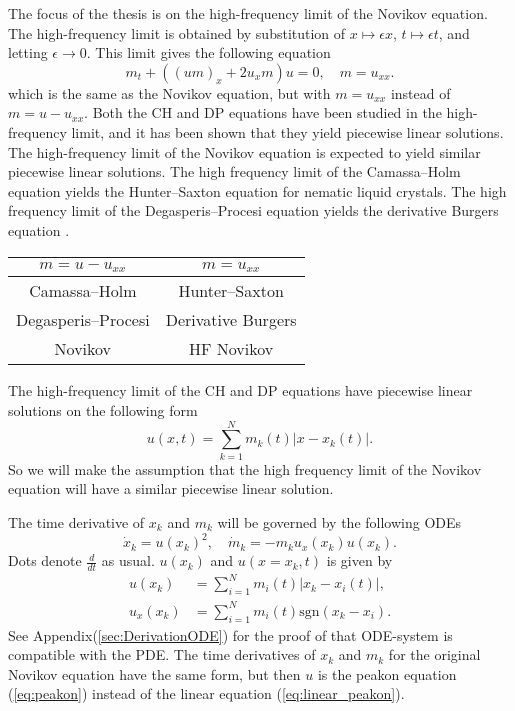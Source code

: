 \documentclass[english,master]{liumaiex}
\theoremstyle{plain}
\theoremstyle{definition}
\newcommand{\sgn}{\text{sgn}}
\begin{document}
The focus of the thesis is on the high-frequency limit of the Novikov equation. The high-frequency limit is obtained by substitution of $x \mapsto \epsilon x$, $t \mapsto \epsilon t$, and letting $\epsilon \rightarrow 0$. This limit gives the following equation
\begin{equation} \label{eq:Novikov_high_freq}
	m_t + ((um)_x + 2u_xm) u = 0,\quad m = u_{xx}.
\end{equation}
which is the same as the Novikov equation, but with $m = u_{xx}$ instead of $m = u - u_{xx}$. Both the CH and DP equations have been studied in the high-frequency limit, and it has been shown that they yield piecewise linear solutions. The high-frequency limit of the Novikov equation is expected to yield similar piecewise linear solutions. The high frequency limit of the Camassa--Holm equation yields the Hunter--Saxton equation \cite{HunterSaxton_1991,HunterZheng1994} for nematic liquid crystals. The high frequency limit of the Degasperis--Procesi equation yields the derivative Burgers equation \cite{Kohlenberg_2007, Lundmark_2008}.
\begin{center}
  \begin{tabular}{c|c}
    $m=u-u_{xx}$ & $m=u_{xx}$ \\
    \hline
    Camassa--Holm & Hunter--Saxton \\
    \hline
    Degasperis--Procesi & Derivative Burgers \\
    \hline
    Novikov & HF Novikov \\
  \end{tabular}
\end{center}

The high-frequency limit of the CH and DP equations have piecewise linear solutions on the following form
\begin{equation} \label{eq:linear_peakon}
	u(x, t) = \sum_{k = 1}^{N} m_k(t) |x - x_k(t)|.
\end{equation}
So we will make the assumption that the high frequency limit of the Novikov equation will have a similar piecewise linear solution.

The time derivative of $x_k$ and $m_k$ will be governed by the following ODEs
\begin{equation} \label{eq:peakon_odes}
\dot{x}_k = u(x_k)^2, \quad
\dot{m}_k = -m_ku_x(x_k)u(x_k).
\end{equation}
Dots denote $\frac{d}{dt}$ as usual. $u(x_k)$ and $u(x = x_k,t)$ is given by
\begin{align}
	u(x_k) &= \sum_{i = 1}^{N} m_i(t) |x_k - x_i(t)|, \\
	u_x(x_k) &= \sum_{i = 1}^{N} m_i(t) \sgn(x_k - x_i).
\end{align}
See Appendix(\ref{sec:DerivationODE}) for the proof of that ODE-system is compatible with the PDE. The time derivatives of $x_k$ and $m_k$ for the original Novikov equation have the same form, but then $u$ is the peakon equation (\ref{eq:peakon}) instead of the linear equation (\ref{eq:linear_peakon}).
\end{document}
